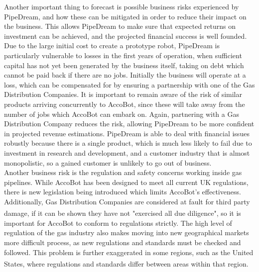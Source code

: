 \documentclass[11pt]{article}		%
\newcommand{\supercite}[1]{\textsuperscript{\cite{#1}}}		%
\begin{document}
 	        \begin{floatingfigure}[r]{0pt} \end{floatingfigure}
	     	Another important thing to forecast is possible business risks experienced by PipeDream, and how these can be mitigated in order to reduce their impact on the business.
	     	This allows PipeDream to make sure that expected returns on investment can be achieved, and the projected financial success is well founded.
	     	\\ 
            \hspace*{3ex}Due to the large initial cost to create a prototype robot, PipeDream is particularly vulnerable to losses in the first years of operation, when sufficient capital has not yet been generated by the business itself, taking on debt which cannot be paid back if there are no jobs.
	     	Initially the business will operate at a loss, which can be compensated for by ensuring a partnership with one of the Gas Distribution Companies.
	     	It is important to remain aware of the risk of similar products arriving concurrently to AccoBot, since these will take away from the number of jobs which AccoBot can embark on.
	     	Again, partnering with a Gas Distribution Company reduces the risk, allowing PipeDream to be more confident in projected revenue estimations.
	     	PipeDream is able to deal with financial issues robustly because there is a single product, which is much less likely to fail due to investment in research and development, and a customer industry that is almost monopolistic, so a gained customer is unlikely to go out of business.
	     	\\ 
            \hspace*{3ex}Another business risk is the regulation and safety concerns working inside gas pipelines.
	     	While AccoBot has been designed to meet all current UK regulations, there is new legislation being introduced which limits AccoBot's effectiveness.
	     	Additionally, Gas Distribution Companies are considered at fault for third party damage, if it can be shown they have not "exercised all due diligence"\supercite{hse1996guide}, so it is important for AccoBot to conform to regulations strictly.
	     	The high level of regulation of the gas industry also makes moving into new geographical markets more difficult process, as new regulations and standards must be checked and followed.
	     	This problem is further exaggerated in some regions, such as the United States, where regulations and standards differ between areas within that region\supercite{pless2011making}.
\end{document}
